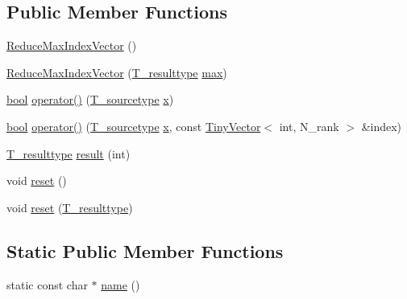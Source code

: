 \subsection*{Public Member Functions}
\begin{DoxyCompactItemize}
\item 
\hyperlink{classReduceMaxIndexVector_a38686e77f31a773dc6d88faec3ee44e8}{Reduce\+Max\+Index\+Vector} ()
\item 
\hyperlink{classReduceMaxIndexVector_a7a9dbd426a68a9f566466e8956056a4d}{Reduce\+Max\+Index\+Vector} (\hyperlink{classReduceMaxIndexVector_aa692334e6c8dff5065b896773e77eac8}{T\+\_\+resulttype} \hyperlink{vecbfn_8cc_a71f214d4a304fdc2089c54dbaf979fe5}{max})
\item 
\hyperlink{compiler_8h_abb452686968e48b67397da5f97445f5b}{bool} \hyperlink{classReduceMaxIndexVector_a6787cb82986079af82cbc547cecdc0e6}{operator()} (\hyperlink{classReduceMaxIndexVector_a959c30c0e834ac3a1f5c2a85e3f8521e}{T\+\_\+sourcetype} \hyperlink{vecnorm1_8cc_ac73eed9e41ec09d58f112f06c2d6cb63}{x})
\item 
\hyperlink{compiler_8h_abb452686968e48b67397da5f97445f5b}{bool} \hyperlink{classReduceMaxIndexVector_a2d2344053943df2afcdbc150becf40fd}{operator()} (\hyperlink{classReduceMaxIndexVector_a959c30c0e834ac3a1f5c2a85e3f8521e}{T\+\_\+sourcetype} \hyperlink{vecnorm1_8cc_ac73eed9e41ec09d58f112f06c2d6cb63}{x}, const \hyperlink{classTinyVector}{Tiny\+Vector}$<$ int, N\+\_\+rank $>$ \&index)
\item 
\hyperlink{classReduceMaxIndexVector_aa692334e6c8dff5065b896773e77eac8}{T\+\_\+resulttype} \hyperlink{classReduceMaxIndexVector_a0d9bff506fe1ecd048488e383a0b9002}{result} (int)
\item 
void \hyperlink{classReduceMaxIndexVector_af46fafae5f96c502156591e5a16adc5f}{reset} ()
\item 
void \hyperlink{classReduceMaxIndexVector_a44d0d4806c00223a67652281f4b4907f}{reset} (\hyperlink{classReduceMaxIndexVector_aa692334e6c8dff5065b896773e77eac8}{T\+\_\+resulttype})
\end{DoxyCompactItemize}
\subsection*{Static Public Member Functions}
\begin{DoxyCompactItemize}
\item 
static const char $\ast$ \hyperlink{classReduceMaxIndexVector_a6e913c296aedb0e2b61609c28d56b45f}{name} ()
\end{DoxyCompactItemize}
